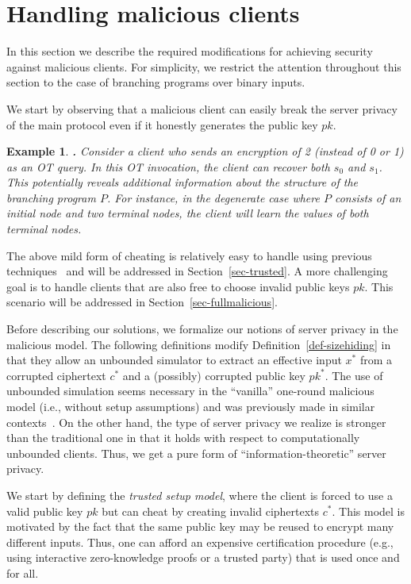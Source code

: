 \documentclass[11pt]{article}
\newtheorem{EXAMPLE}{Example}[section]
\newenvironment{example}{\begin{EXAMPLE} \hspace{-.85em} {\bf .} \rm}%
	{\end{EXAMPLE}}
\begin{document}
\section{Handling malicious clients}
\label{sec-malicious}

In this section we describe the required modifications for
achieving security against malicious clients.
For simplicity, we restrict the
attention throughout this section to the case of branching programs
over binary inputs.

We start by observing that a malicious client can easily break the
server privacy of the main protocol even if it honestly generates
the public key $pk$.

\begin{example}
\label{ex-simpleattack} Consider a client who sends an encryption
of 2 (instead of 0 or 1) as an OT query. In this OT invocation, the
client can recover both $s_0$ and $s_1$. This potentially reveals
additional information about the structure of the branching program
$P$. For instance, in the degenerate case where $P$ consists of an
initial node and two terminal nodes, the client will learn the
values of both terminal nodes.
\end{example}

The above mild form of cheating is relatively easy to handle using
previous techniques~\cite{GIKM,AIR01,L05} and will be addressed in
Section~\ref{sec-trusted}. A more challenging goal is to handle
clients that are also free to choose invalid public keys $pk$. This
scenario will be addressed in Section~\ref{sec-fullmalicious}.

Before describing our solutions, we formalize our notions of server
privacy in the malicious model. The following definitions modify
Definition~\ref{def-sizehiding} in that they allow an unbounded
simulator to extract an effective input $x^*$ from a corrupted
ciphertext $c^*$ and a (possibly) corrupted public key $pk^*$. The
use of unbounded simulation seems necessary in the ``vanilla''
one-round malicious model (i.e., without setup assumptions) and was
previously made in similar
contexts~\cite{NP01,AIR01,FIPR05,T05,L05}. On the other hand, the
type of server privacy we realize is stronger than the traditional
one in that it holds with respect to computationally unbounded
clients. Thus, we get a pure form of ``information-theoretic''
server privacy.

We start by defining the {\em trusted setup model}, where the
client is forced to use a valid public key $pk$ but can cheat by
creating invalid ciphertexts $c^*$. This model is motivated by the
fact that the same public key may be reused to encrypt many
different inputs. Thus, one can afford an expensive certification
procedure (e.g., using interactive zero-knowledge proofs or a
trusted party) that is used once and for all.
\end{document}
